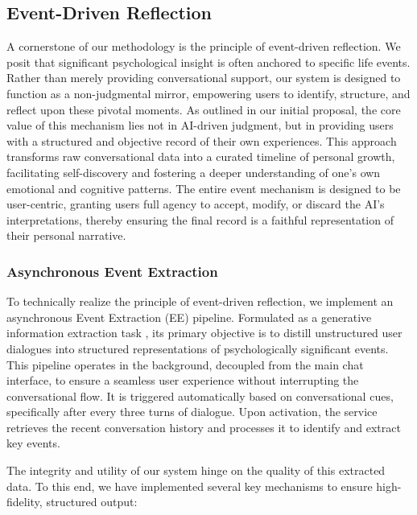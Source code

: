 \subsection{Event-Driven Reflection}
\label{subsec:event_driven_reflection}

A cornerstone of our methodology is the principle of event-driven reflection. We posit that significant psychological insight is often anchored to specific life events. Rather than merely providing conversational support, our system is designed to function as a non-judgmental mirror, empowering users to identify, structure, and reflect upon these pivotal moments. As outlined in our initial proposal, the core value of this mechanism lies not in AI-driven judgment, but in providing users with a structured and objective record of their own experiences. This approach transforms raw conversational data into a curated timeline of personal growth, facilitating self-discovery and fostering a deeper understanding of one's own emotional and cognitive patterns. The entire event mechanism is designed to be user-centric, granting users full agency to accept, modify, or discard the AI's interpretations, thereby ensuring the final record is a faithful representation of their personal narrative.

\subsubsection{Asynchronous Event Extraction}
\label{subsubsec:event_extraction}

To technically realize the principle of event-driven reflection, we implement an asynchronous Event Extraction (EE) pipeline. Formulated as a generative information extraction task \cite{xu2023large}, its primary objective is to distill unstructured user dialogues into structured representations of psychologically significant events. This pipeline operates in the background, decoupled from the main chat interface, to ensure a seamless user experience without interrupting the conversational flow. It is triggered automatically based on conversational cues, specifically after every three turns of dialogue. Upon activation, the service retrieves the recent conversation history and processes it to identify and extract key events.

The integrity and utility of our system hinge on the quality of this extracted data. To this end, we have implemented several key mechanisms to ensure high-fidelity, structured output:

